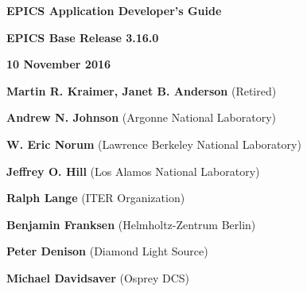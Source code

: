 \def\divider{\par
  \vskip 0.5in
  \hrulefill
  \vskip 0.5in
}

\divider

\Huge \textbf{EPICS Application Developer's Guide}

\vskip 0.5in

\Large \textbf{EPICS Base Release 3.16.0}

\textbf{10 November 2016}

\vskip 0.5in

\normalsize
\textbf{Martin R. Kraimer, Janet B. Anderson} (Retired)

\textbf{Andrew N. Johnson} (Argonne National Laboratory)

\textbf{W. Eric Norum} (Lawrence Berkeley National Laboratory)

\textbf{Jeffrey O. Hill} (Los Alamos National Laboratory)

\textbf{Ralph Lange} (ITER Organization)

\textbf{Benjamin Franksen} (Helmholtz-Zentrum Berlin)

\textbf{Peter Denison} (Diamond Light Source)

\textbf{Michael Davidsaver} (Osprey DCS)

\divider
